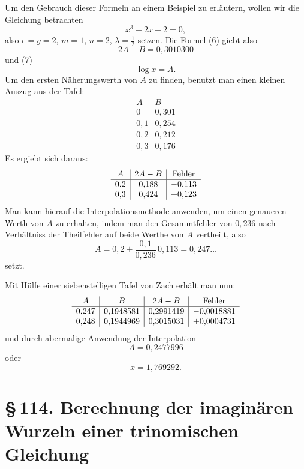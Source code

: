 \documentclass[11pt]{article}
\providecommand{\sect}[2]{\section*{\S\,#1. #2}}
\begin{document}
Um den Gebrauch dieser Formeln an einem Beispiel zu erläutern, wollen wir die Gleichung betrachten
\[
        x^3-2x-2=0,
\]
also $e=g=2$, $m=1$, $n=2$, $\lambda=\tfrac12$ setzen. Die Formel (6) giebt also
\begin{equation}
        2A-B=0{,}3010300
\tag{8}
\end{equation}
und (7)
\begin{equation}
        \log x=A.
\tag{9}
\end{equation}
Um den ersten Näherungswerth von $A$ zu finden, benutzt man einen kleinen Auszug aus der Tafel:
\[
\begin{array}{c|c}
A&B\\ \hline
0&0{,}301\\
0{,}1&0{,}254\\
0{,}2&0{,}212\\
0{,}3&0{,}176
\end{array}
\]
Es ergiebt sich daraus:
\[
\begin{array}{c|c|c}
A&2A-B&\hbox{Fehler}\\ \hline
0{,}2&0{,}188&-0{,}113\\
0{,}3&0{,}424&+0{,}123
\end{array}
\]
Man kann hierauf die Interpolationsmethode anwenden, um einen genaueren Werth von $A$ zu erhalten, indem man den Gesammtfehler von $0{,}236$ nach Verhältniss der Theilfehler auf beide Werthe von $A$ vertheilt, also
\[
        A=0{,}2+\frac{0{,}1}{0{,}236}\,0{,}113=0{,}247\ldots
\]
setzt.

Mit Hülfe einer siebenstelligen Tafel von Zach erhält man nun:
\[
\begin{array}{c|c|c|c}
A&B&2A-B&\hbox{Fehler}\\ \hline
0{,}247&0{,}1948581&0{,}2991419&-0{,}0018881\\
0{,}248&0{,}1944969&0{,}3015031&+0{,}0004731
\end{array}
\]
und durch abermalige Anwendung der Interpolation
\[
        A=0{,}2477996
\]
oder
\[
        x=1{,}769292.
\]

\sect{114}{Berechnung der imaginären Wurzeln einer trinomischen Gleichung}
\end{document}
